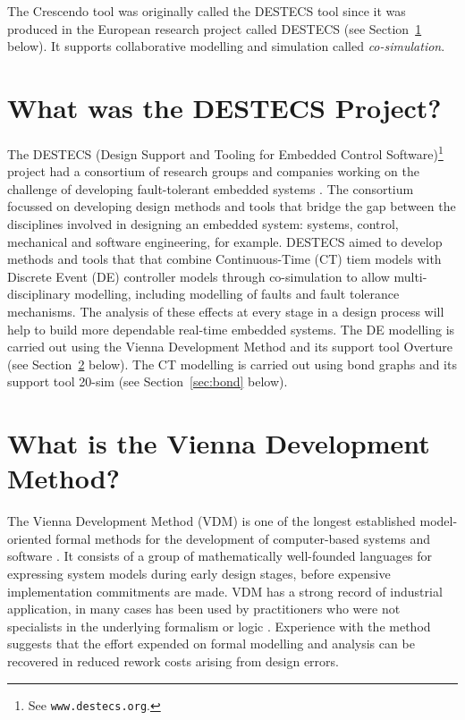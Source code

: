 \documentclass{crescendorepchap}
\newcommand{\url}[1]{\texttt{#1}}
\begin{document}
The Crescendo tool was originally called the DESTECS tool since it was produced in the European research project called DESTECS (see Section~\ref{sec:destecs} below). It supports collaborative modelling and simulation called \emph{co-simulation}. 

\section{What was the DESTECS Project?}\label{sec:destecs}

The DESTECS (Design Support and Tooling for Embedded Control
Software)\footnote{See \url{www.destecs.org}.} project had a
consortium of research groups and companies working on the challenge
of developing fault-tolerant embedded systems \cite{Broenink&10}. The
consortium focussed on developing design methods and tools that
bridge the gap between the disciplines involved in designing an
embedded system: systems, control, mechanical and software
engineering, for example.  DESTECS aimed to develop methods and tools
that that combine Continuous-Time (CT) tiem models with Discrete Event (DE)
controller models through co-simulation to allow multi-disciplinary
modelling, including modelling of faults and fault tolerance
mechanisms. The analysis of these effects at every stage in a design
process will help to build more dependable real-time embedded systems. The DE modelling is carried out using the Vienna Development Method and its support tool Overture (see Section~\ref{sec:vdm} below). The CT modelling is carried out using bond graphs and its support tool 20-sim (see Section~\ref{sec:bond} below).

\section{What is the Vienna Development Method?} \label{sec:vdm}

The Vienna Development Method (VDM) is one of the longest established
model-oriented formal methods for the development of computer-based
systems and software
\cite{Bjorner&78,Jones90a,Fitzgerald&08c}. It consists of a
group of mathematically well-founded languages for expressing system
models during early design stages, before expensive implementation
commitments are made. VDM has a strong record of industrial
application, in many cases has been used
by practitioners who were not specialists in
the underlying formalism or logic
\cite{Larsen&96b,Clement&99,Kurita&09}. Experience with the method
suggests that the effort expended on formal modelling and analysis can
be recovered in reduced rework costs arising from design errors.
\end{document}
